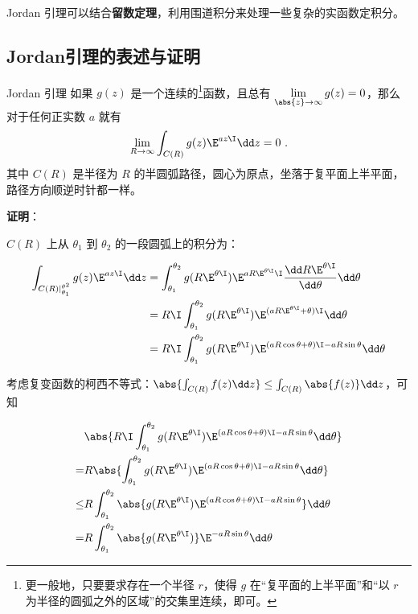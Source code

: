 



Jordan 引理可以结合\textbf{留数定理}，利用围道积分来处理一些复杂的实函数定积分。

\subsection{Jordan引理的表述与证明}

\begin{theorem}{Jordan 引理}\label{JdLem_the1}
如果 $g(z)$ 是一个连续的\footnote{更一般地，只要要求存在一个半径 $r$，使得 $g$ 在“复平面的上半平面”和“以 $r$ 为半径的圆弧之外的区域”的交集里连续，即可。}函数，且总有 $\lim\limits_{\abs{z}\to\infty}g(z)=0$，那么对于任何正实数 $a$ 就有
\begin{equation}
\lim\limits_{R\to \infty}\int_{C(R)}g(z)\E^{az\I}\dd z=0~.
\end{equation}
其中 $C(R)$ 是半径为 $R$ 的半圆弧路径，圆心为原点，坐落于复平面上半平面，路径方向顺逆时针都一样。


\end{theorem}

\textbf{证明}：

$C(R)$ 上从 $\theta_1$ 到 $\theta_2$ 的一段圆弧上的积分为：

\begin{equation}
\begin{aligned}
\int_{C(R)|_{\theta_1}^{\theta^2}}g(z)\E^{az\I}\dd z&=\int_{\theta_1}^{\theta_2}g( R\E^{\theta\I} )\E^{aR\E^{\theta\I}\I}\frac{\dd R\E^{\theta\I}}{\dd \theta}\dd\theta\\
&=R\I\int_{\theta_1}^{\theta_2}g(R\E^{\theta\I})\E^{(aR\E^{\theta\I}+\theta)\I}\dd\theta\\
&=R\I\int_{\theta_1}^{\theta_2}g(R\E^{\theta\I})\E^{(aR\cos\theta+\theta)\I-aR\sin\theta}\dd\theta
\end{aligned}
\end{equation}

考虑复变函数的柯西不等式：$\abs{\int_{C(R)}f(z)\dd z} \leq \int_{C(R)}\abs{f(z)}\dd z$，可知

\begin{equation}\label{JdLem_eq4}
\begin{aligned}
&\abs{R\I\int_{\theta_1}^{\theta_2}g(R\E^{\theta\I})\E^{(aR\cos\theta+\theta)\I-aR\sin\theta}\dd\theta}\\
=&R\abs{\int_{\theta_1}^{\theta_2}g(R\E^{\theta\I})\E^{(aR\cos\theta+\theta)\I-aR\sin\theta}\dd\theta}\\
\leq&R\int_{\theta_1}^{\theta_2}\abs{g(R\E^{\theta\I})\E^{(aR\cos\theta+\theta)\I-aR\sin\theta}}\dd\theta\\
=&R\int_{\theta_1}^{\theta_2}\abs{g(R\E^{\theta\I})}\E^{-aR\sin\theta}\dd\theta
\end{aligned}
\end{equation}

